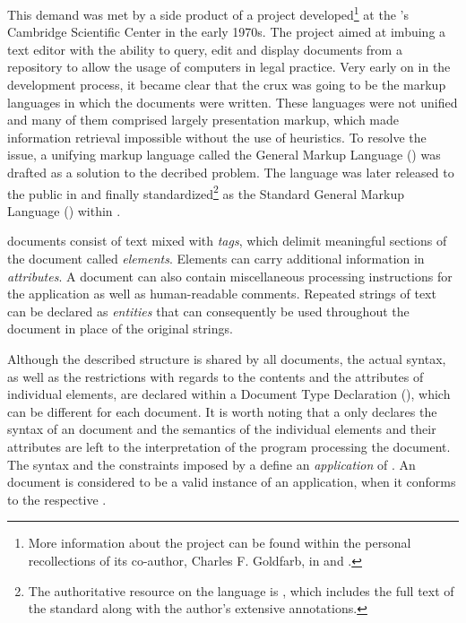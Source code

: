 \documentclass{book}
\begin{document}
        This demand was met by a side product of a project developed\footnote{
          More information about the project can be found within the personal
          recollections of its co-author, Charles F. Goldfarb, in
          \cite{goldfarb96} and \cite{goldfarb97:whySGML}.
        } at the 's Cambridge Scientific Center in the early 1970s.
        The project aimed at imbuing a text editor with the ability to query,
        edit and display documents from a repository to allow the usage of
        computers in legal practice. Very early on in the development process,
        it became clear that the crux was going to be the markup languages in
        which the documents were written. These languages were not unified and
        many of them comprised largely presentation markup, which made
        information retrieval impossible without the use of heuristics. To
        resolve the issue, a unifying markup language called the General Markup
        Language () was drafted as a solution to the decribed
        problem. The language was later released to the public in
        \cite{goldfarb81} and finally standardized\footnote{
          The authoritative resource on the  language is
          \cite{goldfarb91}, which includes the full text of the standard along
          with the author's extensive annotations.
        } as the Standard General Markup Language () within
        \cite{iso8879}.

         documents consist of text mixed with \emph{tags}, which
        delimit meaningful sections of the document called \emph{elements}.
        Elements can carry additional information in \emph{attributes}. A
         document can also contain miscellaneous processing
        instructions for the application as well as human-readable comments.
        Repeated strings of text can be declared as \emph{entities} that can
        consequently be used throughout the document in place of the original
        strings.
        
        Although the described structure is shared by all 
        documents, the actual syntax, as well as the restrictions with regards
        to the contents and the attributes of individual elements, are declared
        within a Document Type Declaration (), which can be
        different for each document. It is worth noting that a 
        only declares the syntax of an  document and the semantics
        of the individual elements and their attributes are left to the
        interpretation of the program processing the document. The syntax and
        the constraints imposed by a  define an \emph{application}
        of . An  document is considered to be a
        valid instance of an  application, when it conforms to the
        respective .
\end{document}
